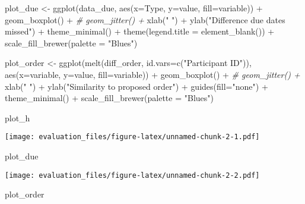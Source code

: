 \documentclass[
]{article}
\newenvironment{Shaded}{\begin{snugshade}}{\end{snugshade}}
\newcommand{\AttributeTok}[1]{\textcolor[rgb]{0.77,0.63,0.00}{#1}}
\newcommand{\CommentTok}[1]{\textcolor[rgb]{0.56,0.35,0.01}{\textit{#1}}}
\newcommand{\FunctionTok}[1]{\textcolor[rgb]{0.00,0.00,0.00}{#1}}
\newcommand{\NormalTok}[1]{#1}
\newcommand{\OtherTok}[1]{\textcolor[rgb]{0.56,0.35,0.01}{#1}}
\newcommand{\SpecialCharTok}[1]{\textcolor[rgb]{0.00,0.00,0.00}{#1}}
\newcommand{\StringTok}[1]{\textcolor[rgb]{0.31,0.60,0.02}{#1}}
\begin{document}
\begin{Shaded}
\begin{Highlighting}[]
\NormalTok{plot\_due }\OtherTok{\textless{}{-}} \FunctionTok{ggplot}\NormalTok{(data\_due, }\FunctionTok{aes}\NormalTok{(}\AttributeTok{x=}\NormalTok{Type, }\AttributeTok{y=}\NormalTok{value, }\AttributeTok{fill=}\NormalTok{variable)) }\SpecialCharTok{+} 
  \FunctionTok{geom\_boxplot}\NormalTok{() }\SpecialCharTok{+} 
  \CommentTok{\# geom\_jitter() +}
  \FunctionTok{xlab}\NormalTok{(}\StringTok{" "}\NormalTok{) }\SpecialCharTok{+} \FunctionTok{ylab}\NormalTok{(}\StringTok{"Difference due dates missed"}\NormalTok{) }\SpecialCharTok{+}
  \FunctionTok{theme\_minimal}\NormalTok{() }\SpecialCharTok{+} 
  \FunctionTok{theme}\NormalTok{(}\AttributeTok{legend.title =} \FunctionTok{element\_blank}\NormalTok{()) }\SpecialCharTok{+}
  \FunctionTok{scale\_fill\_brewer}\NormalTok{(}\AttributeTok{palette =} \StringTok{"Blues"}\NormalTok{)}

\NormalTok{plot\_order }\OtherTok{\textless{}{-}} \FunctionTok{ggplot}\NormalTok{(}\FunctionTok{melt}\NormalTok{(diff\_order, }\AttributeTok{id.vars=}\FunctionTok{c}\NormalTok{(}\StringTok{"Participant ID"}\NormalTok{)), }\FunctionTok{aes}\NormalTok{(}\AttributeTok{x=}\NormalTok{variable, }\AttributeTok{y=}\NormalTok{value, }\AttributeTok{fill=}\NormalTok{variable)) }\SpecialCharTok{+} 
  \FunctionTok{geom\_boxplot}\NormalTok{() }\SpecialCharTok{+} 
  \CommentTok{\# geom\_jitter() +}
  \FunctionTok{xlab}\NormalTok{(}\StringTok{" "}\NormalTok{) }\SpecialCharTok{+} \FunctionTok{ylab}\NormalTok{(}\StringTok{"Similarity to proposed order"}\NormalTok{) }\SpecialCharTok{+} 
  \FunctionTok{guides}\NormalTok{(}\AttributeTok{fill=}\StringTok{"none"}\NormalTok{) }\SpecialCharTok{+}
  \FunctionTok{theme\_minimal}\NormalTok{() }\SpecialCharTok{+} 
  \FunctionTok{scale\_fill\_brewer}\NormalTok{(}\AttributeTok{palette =} \StringTok{"Blues"}\NormalTok{)}

\NormalTok{plot\_h}
\end{Highlighting}
\end{Shaded}

\texttt{[image: evaluation\_files/figure-latex/unnamed-chunk-2-1.pdf]}

\begin{Shaded}
\begin{Highlighting}[]
\NormalTok{plot\_due}
\end{Highlighting}
\end{Shaded}

\texttt{[image: evaluation\_files/figure-latex/unnamed-chunk-2-2.pdf]}

\begin{Shaded}
\begin{Highlighting}[]
\NormalTok{plot\_order}
\end{Highlighting}
\end{Shaded}
\end{document}

